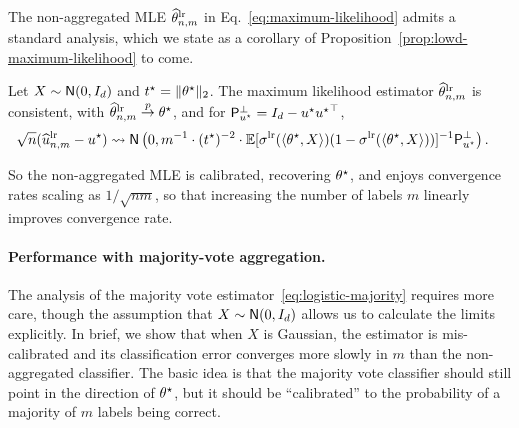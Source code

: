 The
non-aggregated MLE $\widehat{\theta}^{\textup{lr}}_{n,m}$ in Eq.~\eqref{eq:maximum-likelihood}
admits a standard analysis,
which we state as a corollary of
Proposition~\ref{prop:lowd-maximum-likelihood} to come.
%
\begin{corollary}
  \label{cor:lowd-maximum-likelihood-Gaussian} 
  Let $X \sim \mathsf{N}(0, I_d)$ and $t^\star = \|{\theta^\star}\|_2$. The maximum
  likelihood estimator $\widehat{\theta}^{\textup{lr}}_{n,m}$ is consistent, with $\widehat{\theta}^{\textup{lr}}_{n,m} \stackrel{p}{\rightarrow}
  \theta^\star$, and for $\mathsf{P}_{u^\star}^\perp = I_d - u^\star {u^\star}^\top$,
  \begin{align*}
    \sqrt{n} (\widehat{u}^{\textup{lr}}_{n,m} - u^\star)
    & \rightsquigarrow \mathsf{N}\left(0,  m^{-1}
    \cdot (t^\star)^{-2} \cdot \mathbb{E}[\sigma^{\textup{lr}}(\langle\theta^\star, X\rangle)
      (1 - \sigma^{\textup{lr}}(\langle\theta^\star, X\rangle))]^{-1}
    \mathsf{P}_{u^\star}^\perp \right).
  \end{align*}
\end{corollary}
\noindent
So the non-aggregated MLE is calibrated, recovering 
$\theta^\star$,
and enjoys convergence rates scaling as
$1/\sqrt{nm}$, so that increasing the number of labels $m$ linearly 
improves convergence rate.


\paragraph{Performance with majority-vote aggregation.}

The analysis of the majority vote estimator~\eqref{eq:logistic-majority}
requires more care, though the assumption that $X \sim \mathsf{N}(0, I_d)$ allows
us to calculate the limits explicitly. In
brief, we show that when $X$ is Gaussian, the estimator is mis-calibrated
and its classification error converges more slowly in $m$
than the
non-aggregated classifier.
The basic idea is that the majority vote classifier
should still point in the direction of $\theta^\star$,
but it should be  ``calibrated'' to the probability of a majority
of $m$ labels being correct.


